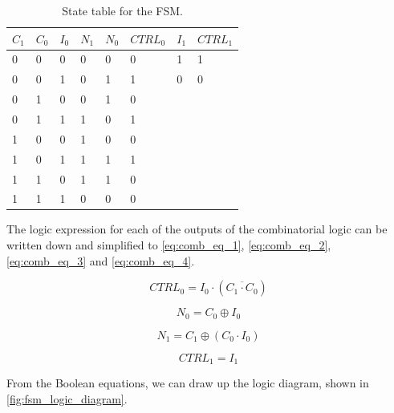 \begin{table}[H]
\caption{State table for the FSM.}
\label{tab:state_table}
\centering
\begin{tabular}{|l|l|l|l|l|l||l|l|}
\hline
\rowcolor[HTML]{C0C0C0} 
$C_1$ & $C_0$ & $I_0$ & $N_1$ & $N_0$ & $CTRL_0$ & $I_1$ & $CTRL_1$\\
\hline
0  & 0  & 0  & 0   & 0   & 0 & 1 & 1\\ 
\hline
0  & 0  & 1  & 0   & 1   & 1 & 0 & 0\\ 
\hline
0  & 1  & 0  & 0   & 1   & 0 \\ 
\cline{1-6}
0  & 1  & 1  & 1   & 0   & 1 \\ 
\cline{1-6}
1  & 0  & 0  & 1   & 0   & 0 \\ 
\cline{1-6}
1  & 0  & 1  & 1   & 1   & 1 \\ 
\cline{1-6}
1  & 1  & 0  & 1   & 1   & 0 \\ 
\cline{1-6}
1  & 1  & 1  & 0   & 0   & 0 \\ 
\cline{1-6}

\end{tabular}
\end{table}

\noindent
The logic expression for each of the outputs of the combinatorial logic can be written down and simplified to \autoref{eq:comb_eq_1}, \ref{eq:comb_eq_2}, \ref{eq:comb_eq_3} and \ref{eq:comb_eq_4}.

\begin{equation}
\label{eq:comb_eq_1}
    CTRL_0 = I_0\cdot(\overline{C_1 \cdot C_0})
\end{equation}

\begin{equation}
\label{eq:comb_eq_2}
    N_0 = C_0 \oplus I_0
\end{equation}

\begin{equation}
\label{eq:comb_eq_3}
    N_1 = C_1 \oplus (C_0 \cdot I_0)
\end{equation}

\begin{equation}
\label{eq:comb_eq_4}
    CTRL_1 = I_1
\end{equation}

From the Boolean equations, we can draw up the logic diagram, shown in \autoref{fig:fsm_logic_diagram}.

